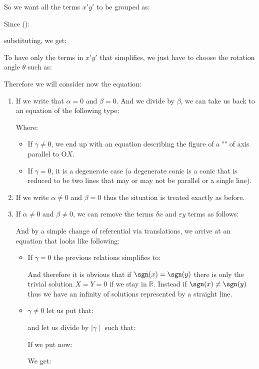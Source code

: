So we want all the terms $x'y'$ to be grouped as:
	
Since ():
	
substituting, we get:
	
To have only the terms in $x'y'$ that simplifies, we just have to choose the rotation angle $\theta$ such as:
	
Therefore we will consider now the equation:
	
	\begin{enumerate}
		\item If we write that $\alpha=0$ and  $\beta=0$. And we divide by $\beta$, we can take us back to an equation of the following type:
		
	Where:
		\begin{itemize}
			\item If $\gamma\neq 0$, we end up with an equation describing the figure of a "" of axis parallel to $\text{O}X$.
			\item If $\gamma = 0$, it is a degenerate case (a degenerate conic is a conic that is reduced to be two lines that may or may not be parallel or a single line).
		\end{itemize}
	\item If we write $\alpha \neq 0$ and $\beta = 0$ thus the situation is treated exactly as before.
	
	\item If $\alpha \neq 0$ and  $\beta \neq 0$, we can remove the terms $\delta x$ and $\varepsilon y$ terms as follows:
	
	
	And by a simple change of referential via translations, we arrive at an equation that looks like following:
		
		\begin{itemize}
			\item If $\gamma=0$ the previous relations simplifies to:
				
				And therefore it is obvious that if $\sgn(x)=\sgn(y)$ there is only the trivial solution $X=Y=0$ if we stay in $\mathbb{R}$. Instead if $\sgn(x) \neq \sgn(y)$ thus we have an infinity of solutions represented by a straight line.
			\item $\gamma \neq 0$ let us put that:
				
			and let us divide by $\mid \gamma \mid$ such that:
				
			If we put now:
			
			We get:
			

\end{itemize}
\end{enumerate}
